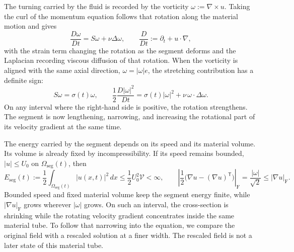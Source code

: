 The turning carried by the fluid is recorded by the vorticity \(\omega:=\nabla\times u\).
Taking the curl of the momentum equation follows that rotation along the material motion and gives
\[
  \frac{D\omega}{Dt}
  =
  S\omega+\nu\Delta\omega,
  \qquad
  \frac{D}{Dt}
  :=
  \partial_t+u\cdot\nabla,
\]
with the strain term changing the rotation as the segment deforms and the Laplacian recording viscous diffusion of that rotation.
When the vorticity is aligned with the same axial direction, \(\omega=|\omega|e\), the stretching contribution has a definite sign:
\[
  S\omega
  =
  \sigma(t)\omega,
  \qquad
  \frac12\frac{D|\omega|^2}{Dt}
  =
  \sigma(t)|\omega|^2
  +
  \nu\,\omega\cdot\Delta\omega.
\]
On any interval where the right-hand side is positive, the rotation strengthens.
The segment is now lengthening, narrowing, and increasing the rotational part of its velocity gradient at the same time.

The energy carried by the segment depends on its speed and its material volume.
Its volume is already fixed by incompressibility.
If its speed remains bounded, \(|u|\leq U_0\) on \(\Omega_{\mathrm{seg}}(t)\), then
\[
  E_{\mathrm{seg}}(t)
  :=
  \frac12\int_{\Omega_{\mathrm{seg}}(t)}|u(x,t)|^2\,dx
  \leq
  \frac12U_0^2\mathcal V
  <
  \infty,
  \qquad
  \left|\frac12\bigl(\nabla u-(\nabla u)^{\mathsf T}\bigr)\right|_{\mathrm F}
  =
  \frac{|\omega|}{\sqrt2}
  \leq
  |\nabla u|_{\mathrm F}.
\]
Bounded speed and fixed material volume keep the segment energy finite, while \(|\nabla u|_{\mathrm F}\) grows wherever \(|\omega|\) grows.
On such an interval, the cross-section is shrinking while the rotating velocity gradient concentrates inside the same material tube.
To follow that narrowing into the equation, we compare the original field with a rescaled solution at a finer width.
The rescaled field is not a later state of this material tube.


